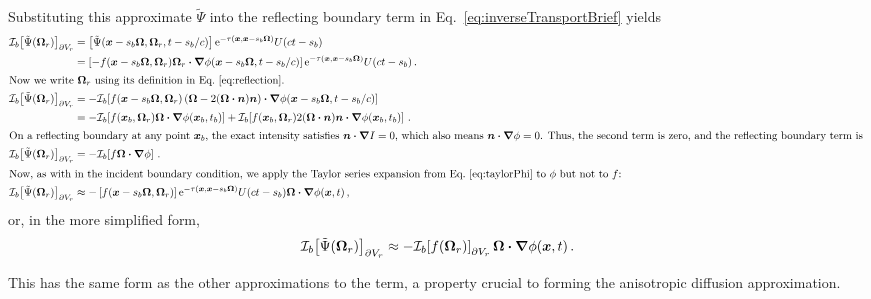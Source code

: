 Substituting this approximate $\tilde\Psi$ into the reflecting boundary term in
Eq.~\eqref{eq:inverseTransportBrief} yields
\begin{align*}
\lopinv{b}{\tilde\Psi(\vec{\Omega}_r)}_{\partial V_r}
  &= \left[\tilde\Psi(\vec{x} - s_b\vec{\Omega}, \vec{\Omega}_r, t - s_b/c)
  \right]
    \eexp^{ -\tau(\vec{x}, \vec{x} - s_b \vec{\Omega})}
    U(ct - s_b)
\\
  &= \left[-f(\vec{x} - s_b\vec{\Omega}, \vec{\Omega}_r) \vec{\Omega}_r 
  \vd \grad \phi(\vec{x} - s_b\vec{\Omega}, t - s_b/c) \right]
  \eexp^{ -\tau(\vec{x}, \vec{x} - s_b \vec{\Omega})}
  U(ct - s_b) \,.
\\ 
\intertext{Now we write $\vec{\Omega}_r$ using its definition in
Eq.~\eqref{eq:reflection}.
}
\lopinv{b}{\tilde\Psi(\vec{\Omega}_r)}_{\partial V_r}
  &= - \lopinv{b}{f(\vec{x} - s_b\vec{\Omega}, \vec{\Omega}_r)
\left(  \vec{\Omega} - 2(\vec{\Omega} \vd \vec{n}) \vec{n} \right)
  \vd \grad \phi(\vec{x} - s_b\vec{\Omega}, t - s_b/c) }
  \\
  &= -\lopinv{b}{f(\vec{x}_b,\vec{\Omega}_r) \vec{\Omega} \vd \grad
  \phi(\vec{x}_b,t_b)}
  + \lopinv{b}{f(\vec{x}_b,\vec{\Omega}_r) 2(\vec{\Omega} \vd \vec{n}) \vec{n} \vd
  \grad \phi(\vec{x}_b,t_b) } \,.
\\ 
\intertext{On a reflecting boundary at any point $\vec{x}_b$, the exact
intensity satisfies $\vec{n} \vd
\grad I = 0$, which also means $\vec{n} \vd \grad \phi=0$. Thus, the second
term is zero, and the reflecting boundary term is
}
\lopinv{b}{\tilde\Psi(\vec{\Omega}_r)}_{\partial V_r}
&= -\lopinv{b}{f \vec{\Omega} \vd \grad \phi} \,.
\\ \intertext{Now, as with in the incident boundary condition, we apply the
Taylor
series expansion from Eq.~\eqref{eq:taylorPhi} to $\phi$ but not to $f$:
}
\lopinv{b}{\tilde\Psi(\vec{\Omega}_r)}_{\partial V_r}
&\approx
-\left[f(\vec{x} - s_b\vec{\Omega}, \vec{\Omega}_r)
  \right]
  \eexp^{ -\tau(\vec{x}, \vec{x} - s_b \vec{\Omega})}
  U(ct - s_b) \vec{\Omega} \vd \grad \phi(\vec{x}, t)\,,
\end{align*}
or, in the more simplified form,
\begin{equation} \label{eq:reflApprox}
\mathcal{I}_{b}\!\left[\tilde\Psi(\bm{\Omega}_r)\right]_{\partial V_r}
\approx  
- \mathcal{I}_{b}\!\left[f(\bm{\Omega}_r)\right]_{\partial V_r}
\bm{\Omega} \bm{\cdot} \bm{\nabla} \phi(\bm{x}, t) \,.
\end{equation}

This has the same form as the other approximations to the term, a property
crucial
to forming the anisotropic diffusion approximation.


